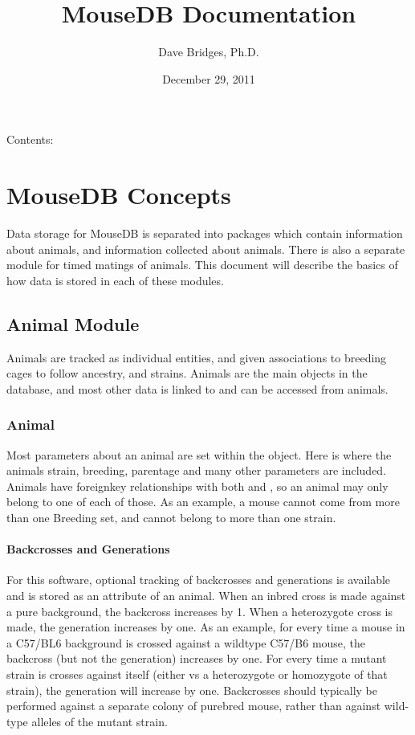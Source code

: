 \documentclass[letterpaper,10pt,english]{sphinxmanual}
\title{MouseDB Documentation}
\date{December 29, 2011}
\author{Dave Bridges, Ph.D.}
\begin{document}
\maketitle
\tableofcontents
{}\label{index::doc}


Contents:


\chapter{MouseDB Concepts}
\label{concepts:welcome-to-mousedb-s-documentation}\label{concepts::doc}\label{concepts:mousedb-concepts}
Data storage for MouseDB is separated into packages which contain information about animals, and information collected about animals.  There is also a separate module for timed matings of animals.  This document will describe the basics of how data is stored in each of these modules.


\section{Animal Module}
\label{concepts:animal-module}
Animals are tracked as individual entities, and given associations to breeding cages to follow ancestry, and strains.  Animals are the main objects in the database, and most other data is linked to and can be accessed from animals.


\subsection{Animal}
\label{concepts:animal}
Most parameters about an animal are set within the {\hyperref[api:mousedb.animal.models.Animal]{}} object. Here is where the animals strain, breeding, parentage and many other parameters are included.  Animals have foreignkey relationships with both {\hyperref[api:mousedb.animal.models.Strain]{}} and {\hyperref[api:mousedb.animal.models.Breeding]{}}, so an animal may only belong to one of each of those.  As an example, a mouse cannot come from more than one Breeding set, and cannot belong to more than one strain.


\subsubsection{Backcrosses and Generations}
\label{concepts:backcrosses-and-generations}
For this software, optional tracking of backcrosses and generations is available and is stored as an attribute of an animal.  When an inbred cross is made against a pure background, the backcross increases by 1.  When a heterozygote cross is made, the generation increases by one.  As an example, for every time a mouse in a C57/BL6 background is crossed against a wildtype C57/B6 mouse, the backcross (but not the generation) increases by one.  For every time a mutant strain is crosses against itself (either vs a heterozygote or homozygote of that strain), the generation will increase by one.  Backcrosses should typically be performed against a separate colony of purebred mouse, rather than against wild-type alleles of the mutant strain.
\end{document}
